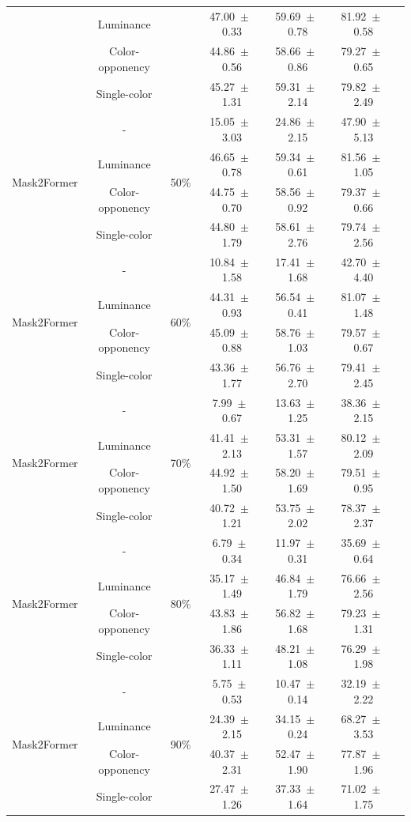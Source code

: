\begin{table}[h]
\begin{tabular}{@{}lccc ccc@{}}
& Luminance & & 47.00~$\pm$~0.33 & 59.69~$\pm$~0.78 & 81.92~$\pm$~0.58 \\
& Color-opponency & & 44.86~$\pm$~0.56 & 58.66~$\pm$~0.86 & 79.27~$\pm$~0.65 \\
& Single-color & & 45.27~$\pm$~1.31 & 59.31~$\pm$~2.14 & 79.82~$\pm$~2.49 \\
\midrule
\multirow{4}{*}{Mask2Former} & - & \multirow{4}{*}{50\%} & 15.05~$\pm$~3.03 & 24.86~$\pm$~2.15 & 47.90~$\pm$~5.13 \\
& Luminance & & 46.65~$\pm$~0.78 & 59.34~$\pm$~0.61 & 81.56~$\pm$~1.05 \\
& Color-opponency & & 44.75~$\pm$~0.70 & 58.56~$\pm$~0.92 & 79.37~$\pm$~0.66 \\
& Single-color & & 44.80~$\pm$~1.79 & 58.61~$\pm$~2.76 & 79.74~$\pm$~2.56 \\
\midrule
\multirow{4}{*}{Mask2Former} & - & \multirow{4}{*}{60\%} & 10.84~$\pm$~1.58 & 17.41~$\pm$~1.68 & 42.70~$\pm$~4.40 \\
& Luminance & & 44.31~$\pm$~0.93 & 56.54~$\pm$~0.41 & 81.07~$\pm$~1.48 \\
& Color-opponency & & 45.09~$\pm$~0.88 & 58.76~$\pm$~1.03 & 79.57~$\pm$~0.67 \\
& Single-color & & 43.36~$\pm$~1.77 & 56.76~$\pm$~2.70 & 79.41~$\pm$~2.45 \\
\midrule
\multirow{4}{*}{Mask2Former} & - & \multirow{4}{*}{70\%} & 7.99~$\pm$~0.67 & 13.63~$\pm$~1.25 & 38.36~$\pm$~2.15 \\
& Luminance & & 41.41~$\pm$~2.13 & 53.31~$\pm$~1.57 & 80.12~$\pm$~2.09 \\
& Color-opponency & & 44.92~$\pm$~1.50 & 58.20~$\pm$~1.69 & 79.51~$\pm$~0.95 \\
& Single-color & & 40.72~$\pm$~1.21 & 53.75~$\pm$~2.02 & 78.37~$\pm$~2.37 \\
\midrule
\multirow{4}{*}{Mask2Former} & - & \multirow{4}{*}{80\%} & 6.79~$\pm$~0.34 & 11.97~$\pm$~0.31 & 35.69~$\pm$~0.64 \\
& Luminance & & 35.17~$\pm$~1.49 & 46.84~$\pm$~1.79 & 76.66~$\pm$~2.56 \\
& Color-opponency & & 43.83~$\pm$~1.86 & 56.82~$\pm$~1.68 & 79.23~$\pm$~1.31 \\
& Single-color & & 36.33~$\pm$~1.11 & 48.21~$\pm$~1.08 & 76.29~$\pm$~1.98 \\
\midrule
\multirow{4}{*}{Mask2Former} & - & \multirow{4}{*}{90\%} & 5.75~$\pm$~0.53 & 10.47~$\pm$~0.14 & 32.19~$\pm$~2.22 \\
& Luminance & & 24.39~$\pm$~2.15 & 34.15~$\pm$~0.24 & 68.27~$\pm$~3.53 \\
& Color-opponency & & 40.37~$\pm$~2.31 & 52.47~$\pm$~1.90 & 77.87~$\pm$~1.96 \\
& Single-color & & 27.47~$\pm$~1.26 & 37.33~$\pm$~1.64 & 71.02~$\pm$~1.75 \\
\midrule
\bottomrule
\end{tabular}
\label{tab:sparse_results_mask2former_acdc_full}
\end{table}